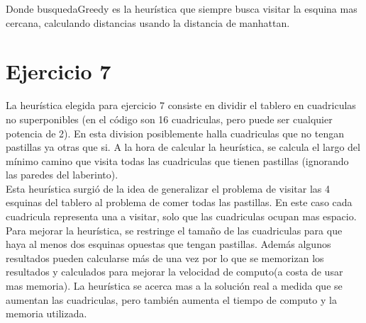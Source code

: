 \documentclass[12pt, titlepage, a4paper]{article}
\begin{document}
Donde busquedaGreedy es la heurística que siempre busca visitar la esquina mas cercana, calculando distancias usando
la distancia de manhattan.


\section{Ejercicio 7}

La heurística elegida para ejercicio 7 consiste en dividir el tablero en cuadriculas no superponibles (en el 
código son 16 cuadriculas, pero puede ser cualquier potencia de 2). En esta division posiblemente halla 
cuadriculas que no tengan pastillas ya otras que si. A la hora de calcular la heurística, se calcula el largo 
del mínimo camino que visita todas las cuadriculas que tienen pastillas (ignorando las paredes del laberinto).\\

Esta heurística surgió de la idea de generalizar el problema de visitar las 4 esquinas del tablero al problema
de comer todas las pastillas. En este caso cada cuadricula representa una  a visitar, solo que las 
cuadriculas ocupan mas espacio.\\

Para mejorar la heurística, se restringe el tamaño de las cuadriculas para que haya al menos dos esquinas 
opuestas que tengan pastillas. Además algunos resultados pueden calcularse más de una vez por lo que se 
memorizan los resultados y calculados para mejorar la velocidad de computo(a costa de usar mas memoria). 
La heurística se acerca mas a la solución real a medida que se aumentan las cuadriculas, pero también aumenta
el tiempo de computo y la memoria utilizada.\\
\end{document}
